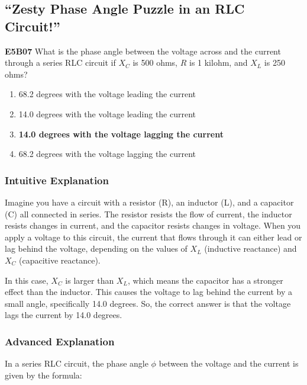\subsection{“Zesty Phase Angle Puzzle in an RLC Circuit!”}

\begin{tcolorbox}[colback=gray!10!white,colframe=black!75!black,title=Multiple Choice Question]
\textbf{E5B07} What is the phase angle between the voltage across and the current through a series RLC circuit if \(X_C\) is 500 ohms, \(R\) is 1 kilohm, and \(X_L\) is 250 ohms?

\begin{enumerate}[label=\Alph*.]
    \item 68.2 degrees with the voltage leading the current
    \item 14.0 degrees with the voltage leading the current
    \item \textbf{14.0 degrees with the voltage lagging the current}
    \item 68.2 degrees with the voltage lagging the current
\end{enumerate}
\end{tcolorbox}

\subsubsection{Intuitive Explanation}
Imagine you have a circuit with a resistor (R), an inductor (L), and a capacitor (C) all connected in series. The resistor resists the flow of current, the inductor resists changes in current, and the capacitor resists changes in voltage. When you apply a voltage to this circuit, the current that flows through it can either lead or lag behind the voltage, depending on the values of \(X_L\) (inductive reactance) and \(X_C\) (capacitive reactance). 

In this case, \(X_C\) is larger than \(X_L\), which means the capacitor has a stronger effect than the inductor. This causes the voltage to lag behind the current by a small angle, specifically 14.0 degrees. So, the correct answer is that the voltage lags the current by 14.0 degrees.

\subsubsection{Advanced Explanation}
In a series RLC circuit, the phase angle \(\phi\) between the voltage and the current is given by the formula:

